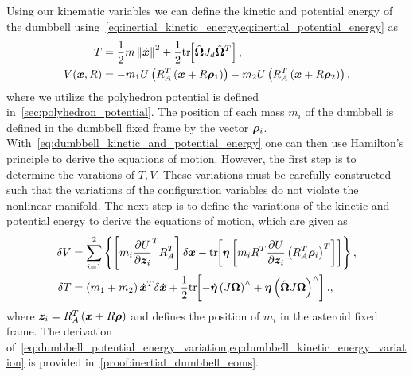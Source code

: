 Using our kinematic variables we can define the kinetic and potential energy of the dumbbell using~\cref{eq:inertial_kinetic_energy,eq:inertial_potential_energy} as
\begin{subequations}\label{eq:dumbbell_kinetic_and_potential_energy}
\begin{align}
    T &= \frac{1}{2} m \left\| \dot{\bm{x}} \right\|^2 + \frac{1}{2} \mathrm{tr}\negthickspace\left[ \hat{\bm{\Omega}} J_d \hat{\bm{\Omega}}^T \right] , \label{eq:dumbbell_kinetic_energy}\\
    V( \bm{x}, R ) &=  - m_1 U \left( R_A^T \left( \bm{x} + R \bm{\rho}_1 \right) \right) - m_2 U \left( R_A^T \left( \bm{x} + R \bm{\rho}_2 \right) \right) , \label{eq:dumbbell_potential_energy}
\end{align}
\end{subequations}     
where we utilize the polyhedron potential is defined in~\cref{sec:polyhedron_potential}.
The position of each mass \(m_i\) of the dumbbell is defined in the dumbbell fixed frame by the vector \(\bm{\rho}_i\). 
With~\cref{eq:dumbbell_kinetic_and_potential_energy} one can then use Hamilton's principle to derive the equations of motion.
However, the first step is to determine the varations of \( T, V \).
These variations must be carefully constructed such that the variations of the configuration variables do not violate the nonlinear manifold.
The next step is to define the variations of the kinetic and potential energy to derive the equations of motion, which are given as
\begin{align} 
    \delta V &= \sum_{i=1}^2 \left\{  \left[ m_i \frac{\partial U}{\partial \bm{z}_i}^T R_A^T  \right] \delta \bm{x} - \mathrm{tr}\negthickspace\left[  \bm{\eta} \left[ m_i R^T \frac{\partial U}{\partial \bm{z}_i} \left( R_A^T \bm{\rho}_i \right)^T \right] \right]  \right\},\label{eq:dumbbell_kinetic_energy_variation} \\ 
    \delta T &= \left( m_1 + m_2 \right) \dot{\bm{x}}^T \delta \dot{\bm{x}} + \frac{1}{2} \mathrm{tr}\negthickspace\left[ - \dot{\bm{\eta}} \left( J \bm{\Omega} \right)^\wedge + \bm{\eta} \left( \hat{\bm{\Omega}} J \bm{\Omega} \right)^\wedge  \right]. \label{eq:dumbbell_potential_energy_variation} ,
\end{align}
where \( \bm{z}_i = R_A^T \left( \bm{x} + R \bm{\rho} \right) \) and defines the position of \( m_i \) in the asteroid fixed frame.
The derivation of~\cref{eq:dumbbell_potential_energy_variation,eq:dumbbell_kinetic_energy_variation} is provided in~\cref{proof:inertial_dumbbell_eoms}.

